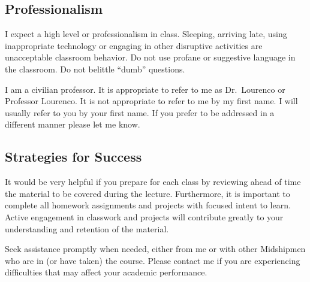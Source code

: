 \documentclass[letterpaper,hidelinks,oneside,11pt]{article}%
\begin{document}
\subsection*{Professionalism}
I expect a high level or professionalism in class. Sleeping, arriving late, using inappropriate technology or engaging in other disruptive activities are unacceptable classroom behavior. Do not use profane or suggestive language in the classroom. Do not belittle ``dumb'' questions.

I am a civilian professor. It is appropriate to refer to me as Dr.\ Lourenco or Professor Lourenco. It is not appropriate to refer to me by my first name. I will usually refer to you by your first name. If you prefer to be addressed in a different manner please let me know.

\subsection*{Strategies for Success}

It would be very helpful if you prepare for each class by reviewing ahead of time the material to be covered during the lecture. Furthermore, it is important to complete all homework assignments and projects with focused intent to learn. Active engagement in classwork and projects will contribute greatly to your understanding and retention of the material.

Seek assistance promptly when needed, either from me or with other Midshipmen who are in (or have taken) the course. Please contact me if you are experiencing difficulties that may affect your academic performance.




\end{document}
